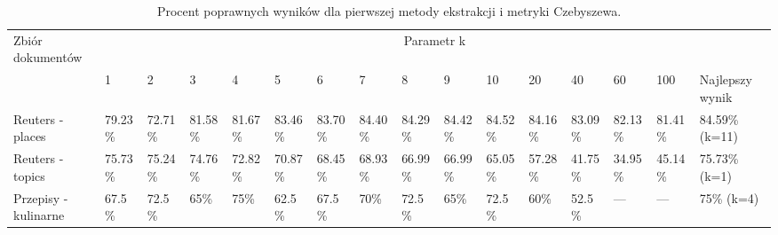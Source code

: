 \documentclass{classrep}
\begin{document}
\begingroup
{\scriptsize  
\setlength{\LTleft}{-20cm plus -1fill}
\setlength{\LTright}{\LTleft}

\begin{longtable}{|p{1cm}|p{0.7cm}|p{0.7cm}|p{0.7cm}|p{0.7cm}|p{0.7cm}|p{0.7cm}|p{0.7cm}|p{0.7cm}|p{0.7cm}|p{0.7cm}|p{0.7cm}|p{0.7cm}|p{0.7cm}|p{0.7cm}|p{1.1cm}|}
\caption{ Procent poprawnych wyników dla pierwszej metody ekstrakcji i metryki Czebyszewa.}\\ 
\hline

Zbiór
dokumentów

 &\multicolumn{15}{c|}{Parametr k}\\
\cline{2-16}
& 1
& 2
& 3
& 4
& 5
& 6
& 7
& 8
& 9
& 10
& 20
& 40
& 60
& 100
& Najlepszy wynik
\\ \hline\hline
Reuters
- places
& 79.23\%	%
& 72.71\%	%
& 81.58\%	%
& 81.67\%	%
& 83.46\%	%
& 83.70\%	%
& 84.40\%	%
& 84.29\%	%
& 84.42\%	%
& 84.52\%	%
& 84.16\%	%
& 83.09\%	%
& 82.13\%	%
& 81.41\%	%
& 84.59\% (k=11)
\\ \hline
Reuters
- topics
& 75.73\%	%
& 75.24\%	%
& 74.76\%	%
& 72.82\%	%
& 70.87\%	%
& 68.45\%	%
& 68.93\%	%
& 66.99\%	%
& 66.99\%	%
& 65.05\%	%
& 57.28\%	%
& 41.75\%	%
& 34.95\%	%
& 45.14\%	%
& 75.73\%	(k=1)
\\ \hline
Przepisy
- kulinarne 
& 67.5\%	%
& 72.5\%	%
& 65\%		%
& 75\%		%
& 62.5\%	%
& 67.5\%	%
& 70\%		%
& 72.5\%	%
& 65\%		%
& 72.5\%	%
& 60\%		%
& 52.5\%	%
& ---		%
& ---		%
& 75\% (k=4)
\\ \hline
\end{longtable}
}
\endgroup




\end{document}
